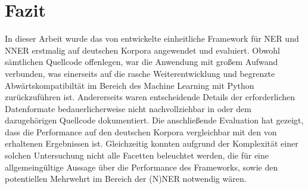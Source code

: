 

\chapter{Fazit}
\label{ch:Fazit}

In dieser Arbeit wurde das von \cite{li2019unified} entwickelte einheitliche Framework für NER und NNER erstmalig auf deutschen Korpora angewendet und evaluiert. Obwohl  sämtlichen Quellcode offenlegen, war die Anwendung mit großem Aufwand verbunden, was einerseits auf die rasche Weiterentwicklung und begrenzte Abwärtskompatibiltät im Bereich des Machine Learning mit Python zurückzuführen ist. Andererseits waren entscheidende Details der erforderlichen Datenformate bedauerlicherweise nicht nachvollziehbar in \cite{li2019unified} oder dem dazugehörigen Quellcode dokumentiert. Die anschließende Evaluation hat gezeigt, dass die Performance auf den deutschen Korpora vergleichbar mit den von \citeauthor{li2019unified} erhaltenen Ergebnissen ist. Gleichzeitig konnten aufgrund der Komplexität einer solchen Untersuchung nicht alle Facetten beleuchtet werden, die für eine allgemeingültige Aussage über die Performance des Frameworks, sowie den potentiellen Mehrwehrt im Bereich der (N)NER notwendig wären.

